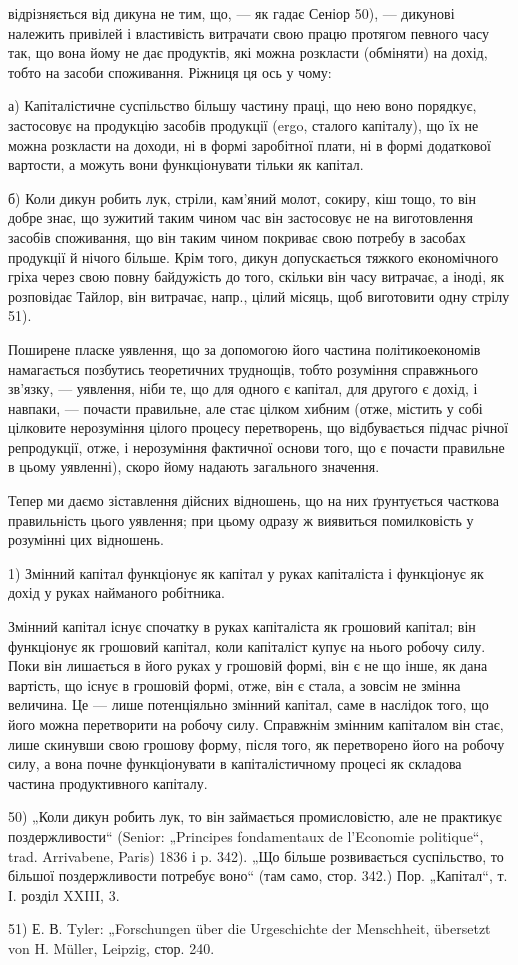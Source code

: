 відрізняється від дикуна не тим, що, — як гадає Сеніор 50), — дикунові
належить привілей і властивість витрачати свою працю протягом певного
часу так, що вона йому не дає продуктів, які можна розкласти (обміняти)
на дохід, тобто на засоби споживання. Ріжниця ця ось у чому:

а) Капіталістичне суспільство більшу частину праці, що нею воно
порядкує, застосовує на продукцію засобів продукції (ergo, сталого
капіталу), що їх не можна розкласти на доходи, ні в формі заробітної
плати, ні в формі додаткової вартости, а можуть вони функціонувати
тільки як капітал.

б) Коли дикун робить лук, стріли, кам’яний молот, сокиру, кіш тощо,
то він добре знає, що зужитий таким чином час він застосовує не на
виготовлення засобів споживання, що він таким чином покриває свою
потребу в засобах продукції й нічого більше. Крім того, дикун допускається
тяжкого економічного гріха через свою повну байдужість до того,
скільки він часу витрачає, а іноді, як розповідає Тайлор, він витрачає,
напр., цілий місяць, щоб виготовити одну стрілу 51).

Поширене пласке уявлення, що за допомогою його частина політикоекономів
намагається позбутись теоретичних труднощів, тобто розуміння
справжнього зв’язку, — уявлення, ніби те, що для одного є капітал, для
другого є дохід, і навпаки, — почасти правильне, але стає цілком хибним
(отже, містить у собі цілковите нерозуміння цілого процесу перетворень,
що відбувається підчас річної репродукції, отже, і нерозуміння фактичної
основи того, що є почасти правильне в цьому уявленні), скоро йому
надають загального значення.

Тепер ми даємо зіставлення дійсних відношень, що на них ґрунтується
часткова правильність цього уявлення; при цьому одразу ж виявиться
помилковість у розумінні цих відношень.

1) Змінний капітал функціонує як капітал у руках капіталіста і функціонує
як дохід у руках найманого робітника.

Змінний капітал існує спочатку в руках капіталіста як грошовий
капітал; він функціонує як грошовий капітал, коли капіталіст
купує на нього робочу силу. Поки він лишається в його руках у грошовій
формі, він є не що інше, як дана вартість, що існує в грошовій
формі, отже, він є стала, а зовсім не змінна величина. Це — лише потенціяльно
змінний капітал, саме в наслідок того, що його можна перетворити
на робочу силу. Справжнім змінним капіталом він стає, лише скинувши
свою грошову форму, після того, як перетворено його на робочу
силу, а вона почне функціонувати в капіталістичному процесі як складова
частина продуктивного капіталу.

50) „Коли дикун робить лук, то він займається промисловістю, але не практикує
поздержливости“ (Senior: „Principes fondamentaux de l’Economie politique“,
trad. Arrivabene, Paris) 1836 і p. 342). „Що більше розвивається суспільство, то
більшої поздержливости потребує воно“ (там само, стор. 342.) Пор. „Капітал“,
т. І. розділ XXIII, 3.

51) Е. В. Tyler: „Forschungen über die Urgeschichte der Menschheit, übersetzt
von H. Müller, Leipzig, стор. 240.
